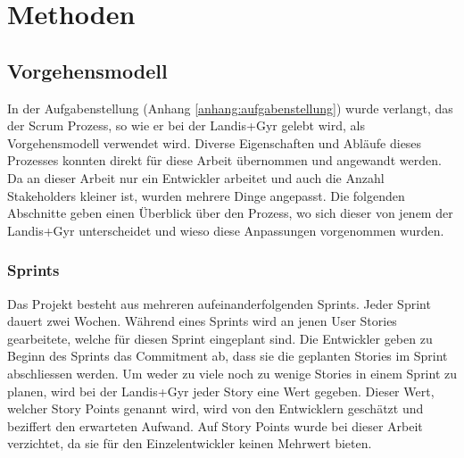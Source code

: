 \chapter{Methoden}






\section{Vorgehensmodell}\label{vorgehen}
In der Aufgabenstellung (Anhang \ref{anhang:aufgabenstellung}) wurde verlangt, das der Scrum Prozess, so wie er bei der Landis+Gyr gelebt wird, als Vorgehensmodell verwendet wird.
Diverse Eigenschaften und Abläufe dieses Prozesses konnten direkt für diese Arbeit übernommen und angewandt werden.
Da an dieser Arbeit nur ein Entwickler arbeitet und auch die Anzahl Stakeholders kleiner ist, wurden mehrere Dinge angepasst.
Die folgenden Abschnitte geben einen Überblick über den Prozess, wo sich dieser von jenem der Landis+Gyr unterscheidet und wieso diese Anpassungen vorgenommen wurden.

\subsection{Sprints}
Das Projekt besteht aus mehreren aufeinanderfolgenden Sprints.
Jeder Sprint dauert zwei Wochen.
Während eines Sprints wird an jenen User Stories gearbeitete, welche für diesen Sprint eingeplant sind.
Die Entwickler geben zu Beginn des Sprints das Commitment ab, dass sie die geplanten Stories im Sprint abschliessen werden.
Um weder zu viele noch zu wenige Stories in einem Sprint zu planen, wird bei der Landis+Gyr jeder Story eine Wert gegeben.
Dieser Wert, welcher Story Points genannt wird, wird von den Entwicklern geschätzt und beziffert den erwarteten Aufwand.
Auf Story Points wurde bei dieser Arbeit verzichtet, da sie für den Einzelentwickler keinen Mehrwert bieten.

